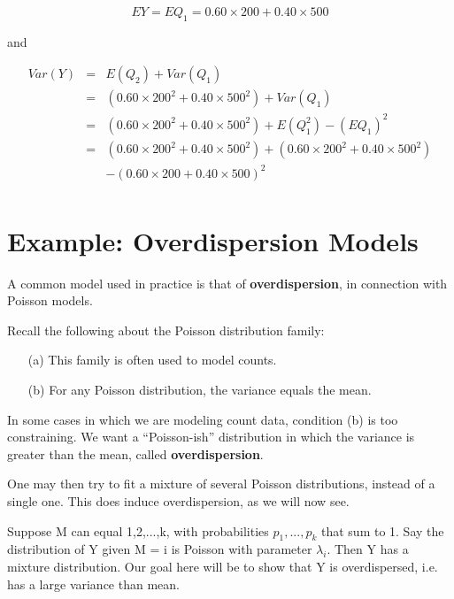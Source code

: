 \begin{equation}
EY = EQ_1 = 0.60 \times 200 + 0.40 \times 500
\end{equation}

and 

\begin{eqnarray}
Var(Y) &=& E(Q_2) + Var(Q_1) \\
&=& (0.60 \times 200^2 + 0.40 \times 500^2) + Var(Q_1) \\
&=& (0.60 \times 200^2 + 0.40 \times 500^2) + E(Q_1^2) - (EQ_1)^2 \\
&=& (0.60 \times 200^2 + 0.40 \times 500^2) + (0.60 \times 200^2 + 0.40
\times 500^2)  \\
& & - (0.60 \times 200 + 0.40 \times 500)^2 \\
\end{eqnarray}

\section{Example:  Overdispersion Models}

A common model used in practice is that of {\bf overdispersion}, in
connection with Poisson models.  

Recall the following about the Poisson distribution family:

\begin{itemize}

\item [(a)] This family is often used to model counts.

\item [(b)] For any Poisson distribution, the variance equals the mean.

\end{itemize}

In some cases in which we are modeling count data, condition (b) is too
constraining.  We want a ``Poisson-ish''
distribution in which the variance is greater
than the mean, called {\bf overdispersion}.  

One may then try to fit a mixture of several Poisson distributions,
instead of a single one.  This does induce overdispersion, as we will
now see.  

Suppose M can equal 1,2,...,k, with probabilities $p_1,...,p_k$ that sum
to 1.  Say the distribution of Y given M = i is Poisson with parameter
$\lambda_i$.  Then Y has a mixture distribution.  Our goal here will be
to show that Y is overdispersed, i.e. has a large variance than mean.

